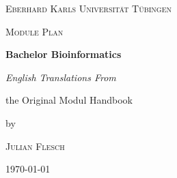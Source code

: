 \documentclass[a4paper]{report}
\begin{document}
	\begin{titlepage}
		\centering
		
		{\scshape\LARGE Eberhard Karls Universität Tübingen \par}
		\vspace{1cm}
		{\scshape\Large Module Plan \par}
		\vspace{1.5cm}
		{\huge\bfseries Bachelor Bioinformatics \par}
		\vspace{2cm}
		{\Large\itshape English Translations From \par the Original Modul Handbook \par}
		\vfill
		by \par
		\textsc{Julian Flesch}
		
		\vfill
		
		{\large \today\par}
	\end{titlepage}
	\renewcommand{\abstractname}{Acknowledgements}
	\begin{abstract}
		This module handbook describes the modules of the bachelor Bioinformatics at the university of Tübingen.
	\end{abstract}
	
	\tableofcontents

	
	
%	
	
%	
%	
	
\end{document}
